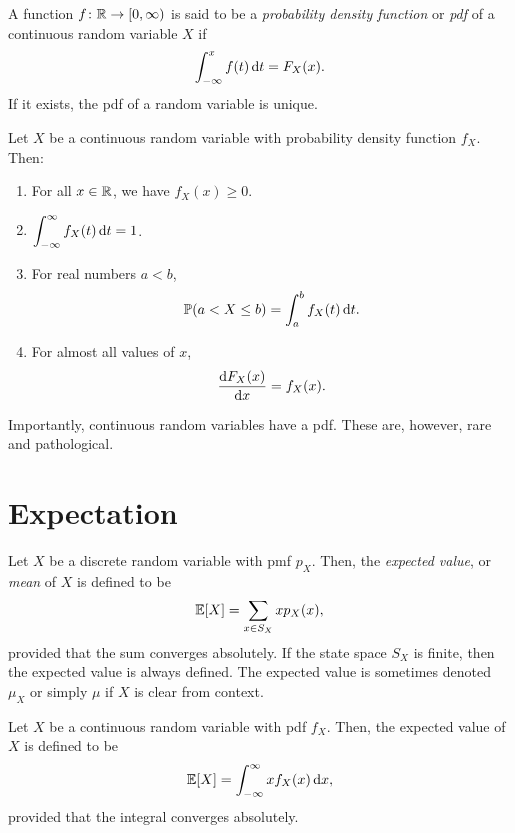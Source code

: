\begin{definition}
  A function $f \colon \mathbb{R} \to [0, \infty)$ is said to be a \emph{probability density function} or \emph{pdf} of a continuous random variable $X$ if \[
    \int_{-\infty}^{x} f(t) \dl t = F_X(x).
  \] If it exists, the pdf of a random variable is unique.
\end{definition}

\begin{proposition}
  Let $X$ be a continuous random variable with probability density function $f_X$. Then:
  \begin{enumerate}
    \item For all $x \in \mathbb{R}$, we have $f_X(x) \ge 0$.
    \item $\displaystyle \int_{-\infty}^{\infty} f_X(t) \dl t = 1$.
    \item For real numbers $a < b$, \[
        \prob(a < X \le b) = \int_{a}^{b} f_X(t) \dl t.
      \]
    \item For almost all values of $x$, \[
        \diff{F_X(x)}{x}  = f_X(x).
    \] 
  \end{enumerate}
\end{proposition}

\begin{remark}
  Importantly,  continuous random variables have a pdf. These are, however, rare and pathological.
\end{remark}

\section{Expectation}

\begin{definition}
  Let $X$ be a discrete random variable with pmf $p_X$. Then, the \emph{expected value}, or \emph{mean} of $X$ is defined to be \[
    \operatorname{\mathbb{E}}[X] = \sum_{x \in S_X} xp_X(x),
  \] provided that the sum converges absolutely. If the state space $S_X$ is finite, then the expected value is always defined. The expected value is sometimes denoted $\mu_X$ or simply $\mu$ if $X$ is clear from context.
\end{definition}

\begin{definition}
  Let $X$ be a continuous random variable with pdf $f_X$. Then, the expected value of $X$ is defined to be \[
    \E[X] = \int_{-\infty}^{\infty} xf_X(x) \dl x,
  \] provided that the integral converges absolutely.
\end{definition}

